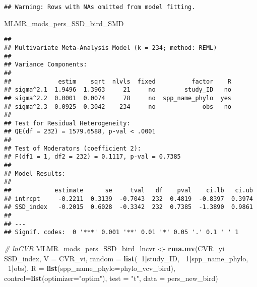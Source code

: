 \documentclass[]{article}
\newenvironment{Shaded}{\begin{snugshade}}{\end{snugshade}}
\newcommand{\KeywordTok}[1]{\textcolor[rgb]{0.13,0.29,0.53}{\textbf{#1}}}
\newcommand{\DataTypeTok}[1]{\textcolor[rgb]{0.13,0.29,0.53}{#1}}
\newcommand{\DecValTok}[1]{\textcolor[rgb]{0.00,0.00,0.81}{#1}}
\newcommand{\StringTok}[1]{\textcolor[rgb]{0.31,0.60,0.02}{#1}}
\newcommand{\CommentTok}[1]{\textcolor[rgb]{0.56,0.35,0.01}{\textit{#1}}}
\newcommand{\OperatorTok}[1]{\textcolor[rgb]{0.81,0.36,0.00}{\textbf{#1}}}
\newcommand{\NormalTok}[1]{#1}
\begin{document}
\begin{verbatim}
## Warning: Rows with NAs omitted from model fitting.
\end{verbatim}

\begin{Shaded}
\begin{Highlighting}[]
\NormalTok{    MLMR_mods_pers_SSD_bird_SMD}
\end{Highlighting}
\end{Shaded}

\begin{verbatim}
## 
## Multivariate Meta-Analysis Model (k = 234; method: REML)
## 
## Variance Components:
## 
##             estim    sqrt  nlvls  fixed          factor    R 
## sigma^2.1  1.9496  1.3963     21     no        study_ID   no 
## sigma^2.2  0.0001  0.0074     78     no  spp_name_phylo  yes 
## sigma^2.3  0.0925  0.3042    234     no             obs   no 
## 
## Test for Residual Heterogeneity:
## QE(df = 232) = 1579.6588, p-val < .0001
## 
## Test of Moderators (coefficient 2):
## F(df1 = 1, df2 = 232) = 0.1117, p-val = 0.7385
## 
## Model Results:
## 
##            estimate      se     tval   df    pval    ci.lb   ci.ub 
## intrcpt     -0.2211  0.3139  -0.7043  232  0.4819  -0.8397  0.3974    
## SSD_index   -0.2015  0.6028  -0.3342  232  0.7385  -1.3890  0.9861    
## 
## ---
## Signif. codes:  0 '***' 0.001 '**' 0.01 '*' 0.05 '.' 0.1 ' ' 1
\end{verbatim}

\begin{Shaded}
\begin{Highlighting}[]
    \CommentTok{# lnCVR}
\NormalTok{    MLMR_mods_pers_SSD_bird_lncvr <-}\StringTok{ }\KeywordTok{rma.mv}\NormalTok{(CVR_yi }\OperatorTok{~}\StringTok{ }\NormalTok{SSD_index, }\DataTypeTok{V =}\NormalTok{ CVR_vi, }
                                            \DataTypeTok{random =} \KeywordTok{list}\NormalTok{(}\OperatorTok{~}\DecValTok{1}\OperatorTok{|}\NormalTok{study_ID, }\OperatorTok{~}\DecValTok{1}\OperatorTok{|}\NormalTok{spp_name_phylo, }\OperatorTok{~}\DecValTok{1}\OperatorTok{|}\NormalTok{obs), }
                                            \DataTypeTok{R =} \KeywordTok{list}\NormalTok{(}\DataTypeTok{spp_name_phylo=}\NormalTok{phylo_vcv_bird), }\DataTypeTok{control=}\KeywordTok{list}\NormalTok{(}\DataTypeTok{optimizer=}\StringTok{"optim"}\NormalTok{), }
                                            \DataTypeTok{test =} \StringTok{"t"}\NormalTok{, }\DataTypeTok{data =}\NormalTok{ pers_new_bird)}
\end{Highlighting}
\end{Shaded}
\end{document}

